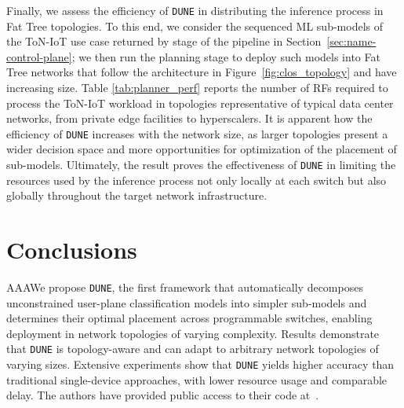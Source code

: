 \documentclass[journal]{IEEEtran}
\theoremstyle{plain} %
\newcommand*\numO[1]{\raisebox{.5pt}{\textcircled{\raisebox{-.9pt} {#1}}}}
\newcommand{\name}{\texttt{\fontsize{9}{11}\selectfont DUNE}\xspace}
\begin{document}
Finally, we assess the efficiency of \name in distributing the inference process in Fat Tree topologies. To this end, we consider the sequenced ML sub-models of the ToN-IoT use case returned by stage \numO{5} of the pipeline in Section~\ref{sec:name-control-plane}; we then run the planning stage \numO{6} to deploy such models into Fat Tree networks that follow the architecture in Figure~\ref{fig:clos_topology} and have increasing size.
Table \ref{tab:planner_perf} reports the number of RFs required to process the ToN-IoT workload in topologies representative of typical data center networks, from private edge facilities to hyperscalers.
It is apparent how the efficiency of \name increases with the network size, as larger topologies present a wider decision space and more opportunities for optimization of the placement of sub-models. Ultimately, the result proves the effectiveness of \name in limiting the resources used by the inference process not only locally at each switch but also globally throughout the target network infrastructure.

\section{Conclusions}
\label{sec:conclusions}

AAAWe propose \name, the first framework that automatically decomposes unconstrained user-plane classification models into simpler sub-models and determines their optimal placement across programmable switches, enabling deployment in network topologies of varying complexity. Results demonstrate that \name is topology-aware and can adapt to arbitrary network topologies of varying sizes.
Extensive experiments show that \name yields higher accuracy than traditional single-device approaches, with lower resource usage and comparable delay.
The authors have provided public access to their code at~\cite{code-dune}.



\end{document}
